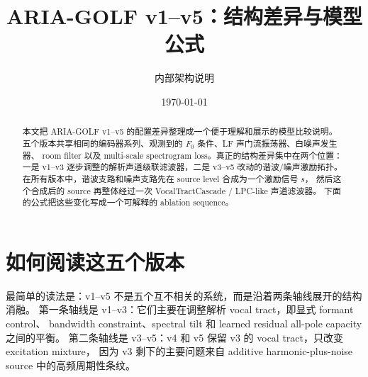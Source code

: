 \documentclass[11pt,fontset=none]{ctexart}
\title{ARIA-GOLF v1--v5：结构差异与模型公式}
\author{内部架构说明}
\date{\today}
\newcommand{\src}{s}
\begin{document}
\maketitle

\begin{abstract}
本文把 ARIA-GOLF v1--v5 的配置差异整理成一个便于理解和展示的模型比较说明。
五个版本共享相同的编码器系列、观测到的 $F_0$ 条件、LF 声门流振荡器、白噪声发生器、
room filter 以及 multi-scale spectrogram loss。真正的结构差异集中在两个位置：
一是 v1--v3 逐步调整的解析声道级联滤波器，二是 v3--v5 改动的谐波/噪声激励拓扑。
在所有版本中，谐波支路和噪声支路先在 source level 合成为一个激励信号 $\src$，
然后这个合成后的 source 再整体经过一次 VocalTractCascade / LPC-like 声道滤波器。
下面的公式把这些变化写成一个可解释的 ablation sequence。
\end{abstract}

\section*{如何阅读这五个版本}

最简单的读法是：v1--v5 不是五个互不相关的系统，而是沿着两条轴线展开的结构消融。
第一条轴线是 v1--v3：它们主要在调整解析 vocal tract，即显式 formant control、
bandwidth constraint、spectral tilt 和 learned residual all-pole capacity 之间的平衡。
第二条轴线是 v3--v5：v4 和 v5 保留 v3 的 vocal tract，只改变 excitation mixture，
因为 v3 剩下的主要问题来自 additive harmonic-plus-noise source 中的高频周期性条纹。
\end{document}
